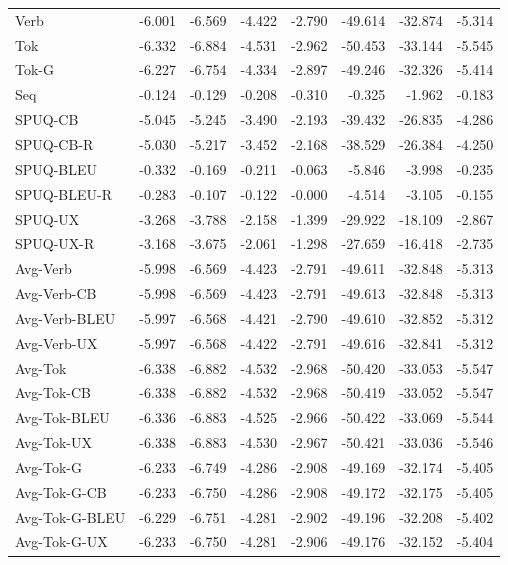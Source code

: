 {\begin{longtable}{@{}lrrrrrrr@{}}
\midrule
Verb & -6.001 & -6.569 & -4.422 & -2.790 & -49.614 & -32.874 & -5.314 \\
\addlinespace
Tok & -6.332 & -6.884 & -4.531 & -2.962 & -50.453 & -33.144 & -5.545 \\
Tok-G & -6.227 & -6.754 & -4.334 & -2.897 & -49.246 & -32.326 & -5.414 \\
\addlinespace
Seq & -0.124 & -0.129 & -0.208 & -0.310 & -0.325 & -1.962 & -0.183 \\
\addlinespace
SPUQ-CB & -5.045 & -5.245 & -3.490 & -2.193 & -39.432 & -26.835 & -4.286 \\
SPUQ-CB-R & -5.030 & -5.217 & -3.452 & -2.168 & -38.529 & -26.384 & -4.250 \\
SPUQ-BLEU & -0.332 & -0.169 & -0.211 & -0.063 & -5.846 & -3.998 & -0.235 \\
SPUQ-BLEU-R & -0.283 & -0.107 & -0.122 & \phantom{-}-0.000 & -4.514 & -3.105 & -0.155 \\
SPUQ-UX & -3.268 & -3.788 & -2.158 & -1.399 & -29.922 & -18.109 & -2.867 \\
SPUQ-UX-R & -3.168 & -3.675 & -2.061 & -1.298 & -27.659 & -16.418 & -2.735 \\
\addlinespace
Avg-Verb & -5.998 & -6.569 & -4.423 & -2.791 & -49.611 & -32.848 & -5.313 \\
Avg-Verb-CB & -5.998 & -6.569 & -4.423 & -2.791 & -49.613 & -32.848 & -5.313 \\
Avg-Verb-BLEU & -5.997 & -6.568 & -4.421 & -2.790 & -49.610 & -32.852 & -5.312 \\
Avg-Verb-UX & -5.997 & -6.568 & -4.422 & -2.791 & -49.616 & -32.841 & -5.312 \\
\addlinespace
Avg-Tok & -6.338 & -6.882 & -4.532 & -2.968 & -50.420 & -33.053 & -5.547 \\
Avg-Tok-CB & -6.338 & -6.882 & -4.532 & -2.968 & -50.419 & -33.052 & -5.547 \\
Avg-Tok-BLEU & -6.336 & -6.883 & -4.525 & -2.966 & -50.422 & -33.069 & -5.544 \\
Avg-Tok-UX & -6.338 & -6.883 & -4.530 & -2.967 & -50.421 & -33.036 & -5.546 \\
Avg-Tok-G & -6.233 & -6.749 & -4.286 & -2.908 & -49.169 & -32.174 & -5.405 \\
Avg-Tok-G-CB & -6.233 & -6.750 & -4.286 & -2.908 & -49.172 & -32.175 & -5.405 \\
Avg-Tok-G-BLEU & -6.229 & -6.751 & -4.281 & -2.902 & -49.196 & -32.208 & -5.402 \\
Avg-Tok-G-UX & -6.233 & -6.750 & -4.281 & -2.906 & -49.176 & -32.152 & -5.404 \\

\end{longtable}}
